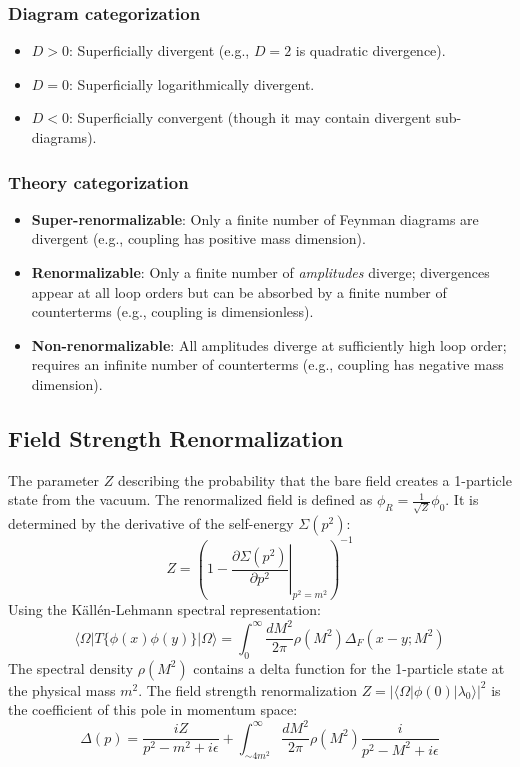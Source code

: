 \documentclass{article}
\begin{document}
\subsubsection*{Diagram categorization}
\begin{itemize}
    \item $D > 0$: Superficially divergent (e.g., $D=2$ is quadratic divergence).
    \item $D = 0$: Superficially logarithmically divergent.
    \item $D < 0$: Superficially convergent (though it may contain divergent sub-diagrams).
\end{itemize}
\subsubsection*{Theory categorization}
\begin{itemize}
    \item \textbf{Super-renormalizable}: Only a finite number of Feynman diagrams are divergent (e.g., coupling has positive mass dimension).
    \item \textbf{Renormalizable}: Only a finite number of \textit{amplitudes} diverge; divergences appear at all loop orders but can be absorbed by a finite number of counterterms (e.g., coupling is dimensionless).
    \item \textbf{Non-renormalizable}: All amplitudes diverge at sufficiently high loop order; requires an infinite number of counterterms (e.g., coupling has negative mass dimension).
\end{itemize}
\subsection{Field Strength Renormalization}
The parameter $Z$ describing the probability that the bare field creates a 1-particle state from the vacuum. The renormalized field is defined as $\phi_R = \frac{1}{\sqrt{Z}}\phi_0$. It is determined by the derivative of the self-energy $\Sigma(p^2)$:
\begin{equation}
    Z = \left(1 - \left. \frac{\partial \Sigma(p^2)}{\partial p^2} \right|_{p^2=m^2}\right)^{-1}
\end{equation}
Using the K\"{a}ll\'{e}n-Lehmann spectral representation:
\begin{equation}
    \langle \Omega | T\{\phi(x)\phi(y)\} | \Omega \rangle = \int_0^\infty \frac{dM^2}{2\pi} \rho(M^2) \Delta_F(x-y; M^2)
\end{equation}
The spectral density $\rho(M^2)$ contains a delta function for the 1-particle state at the physical mass $m^2$. The field strength renormalization $Z = |\langle \Omega | \phi(0) | \lambda_0 \rangle|^2$ is the coefficient of this pole in momentum space:
\begin{equation}
    \Delta(p) = \frac{iZ}{p^2 - m^2 + i\epsilon} + \int_{\sim 4m^2}^\infty \frac{dM^2}{2\pi} \rho(M^2) \frac{i}{p^2 - M^2 + i\epsilon}
\end{equation}
\end{document}
